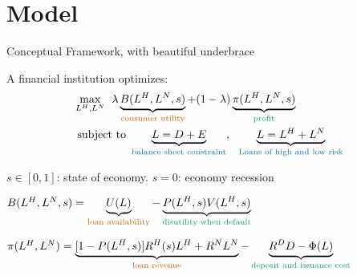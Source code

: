 \documentclass[notes,11pt, aspectratio=169]{beamer}
\newenvironment{wideitemize}{\itemize\addtolength{\itemsep}{10pt}}{\enditemize}  %
\begin{document}
\section{Model}

\begin{frame}{Conceptual Framework, with beautiful underbrace}

A financial institution optimizes:
\begin{align*}
	& \max_{L^H, L^N}  \:\:  \lambda \underbrace{ B(L^H,L^N, s)}_{\text{\textcolor{red}{consumer utility}}} + (1-\lambda) \underbrace{ \pi(L^H, L^N,s)}_{\text{\textcolor{green}{profit}}} \\
	& \text{ subject to  } \underbrace{L = D + E}_{\text{\textcolor{blue}{balance sheet constraint}}}, \:\:\: \underbrace{L = L^H + L^N}_{\text{\textcolor{blue}{Loans of high and low risk}}} 
\end{align*}
\begin{wideitemize}
    \item <1-> $s \in [0,1]$: state of economy. $s=0$: economy recession
    \item <2-> $B(L^H, L^N, s)= \underbrace{U(L)}_{\text{\textcolor{red}{loan availability}}}-\underbrace{P(L^H, s) V(L^H,s)}_{\text{\textcolor{green}{disutility when default}}}$ 
	\item <3> $\pi(L^H, L^N)  = \underbrace{[1-P(L^H, s)]R^H(s) L^H + R^N L^N}_{\text{\textcolor{red}{loan revenue}}} - \underbrace{R^D D -\Phi(L)}_{\text{\textcolor{green}{deposit and issuance cost}}}$
\end{wideitemize}
\end{frame}
\end{document}
